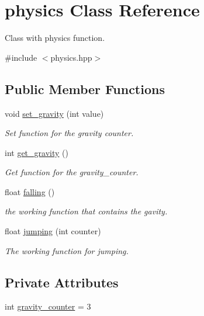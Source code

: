 \hypertarget{classphysics}{}\section{physics Class Reference}
\label{classphysics}


Class with physics function.  




{\ttfamily \#include $<$physics.\+hpp$>$}

\subsection*{Public Member Functions}
\begin{DoxyCompactItemize}
\item 
void \hyperlink{classphysics_a8b0dff646c304dee3cb5c095d821dc87}{set\+\_\+gravity} (int value)
\begin{DoxyCompactList}\small\item\em Set function for the gravity counter. \end{DoxyCompactList}\item 
int \hyperlink{classphysics_a3c4c6084fe0652b0bfd35afa5daa1c1e}{get\+\_\+gravity} ()
\begin{DoxyCompactList}\small\item\em Get function for the gravity\+\_\+counter. \end{DoxyCompactList}\item 
float \hyperlink{classphysics_acca1ee2fb8b760b6e4ee61ae7c2ee3da}{falling} ()
\begin{DoxyCompactList}\small\item\em the working function that contains the gavity. \end{DoxyCompactList}\item 
float \hyperlink{classphysics_aaf1c57aa6e35b9c83ccbfdfa8c18468c}{jumping} (int counter)
\begin{DoxyCompactList}\small\item\em The working function for jumping. \end{DoxyCompactList}\end{DoxyCompactItemize}
\subsection*{Private Attributes}
\begin{DoxyCompactItemize}
\item 
int \hyperlink{classphysics_a49345e47dcf7f97b9e1c20ba622cf5e4}{gravity\+\_\+counter} = 3
\end{DoxyCompactItemize}


